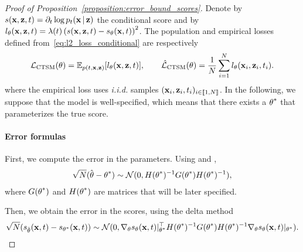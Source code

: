 \begin{proof}[Proof of Proposition~\ref{proposition:error_bound_scores}]

Denote by $s(\bx, \bz, t) = \partial_{t}\log p_{t}(\bx|\bz)$ 
the conditional score and by $l_{\theta}(\bx, \bz, t) = \lambda(t) \left(
s(\bx, \bz, t) - s_{\theta}(\bx, t)
\right)^2$. The population and empirical losses defined from~\eqref{eq:l2_loss_conditional} are respectively
\begin{align}
\mathcal{L}_{\text{CTSM}}(\btheta) 
= 
\E_{p(t, \bx, \bz)} [
l_{\btheta}(\bx, \bz, t)
]
, \qquad 
\hat{\mathcal{L}}_{\text{CTSM}}(\btheta) 
= 
\frac{1}{N} \sum_{i=1}^N
l_{\btheta}(\bx_i, \bz_i, t_i).
\end{align}
where the empirical loss uses \textit{i.i.d.} samples $(\bx_i, \bz_i, t_i)_{i \in \llbracket 1, N \rrbracket}$. In the following, we suppose that the model is well-specified, which means that there exists a $\btheta^*$ that parameterizes the true score.

\paragraph{Error formulas}

First, we compute the error in the parameters. Using \citet[Section 4.7]{bach2024learningtheorybook} and \citet[Theorem 5.23]{vandervaart2000asympstats}, 
\begin{align}
\sqrt{N}(\hat{\btheta} - \btheta^*) 
\sim 
\mathcal{N}(
0,
H(\btheta^*)^{-1} G(\btheta^*) H(\btheta^*)^{-1}
),
\end{align}
where $G(\btheta^*)$ and $H(\btheta^*)$ are matrices that will be later specified. 

Then, we obtain the error in the scores, using the delta method
\begin{align}
\sqrt{N}(s_{\hat{\btheta}}(\bx, t) - s_{\btheta^*}(\bx, t))
\sim
\mathcal{N}(
0,
\nabla_{\btheta} s_{\btheta}(\bx, t)|_{\btheta^*}^\top
H(\btheta^*)^{-1}
G(\btheta^*) H(\btheta^*)^{-1}
\nabla_{\btheta} s_{\btheta}(\bx, t)|_{\btheta^*}
).
\end{align}


\end{proof}
